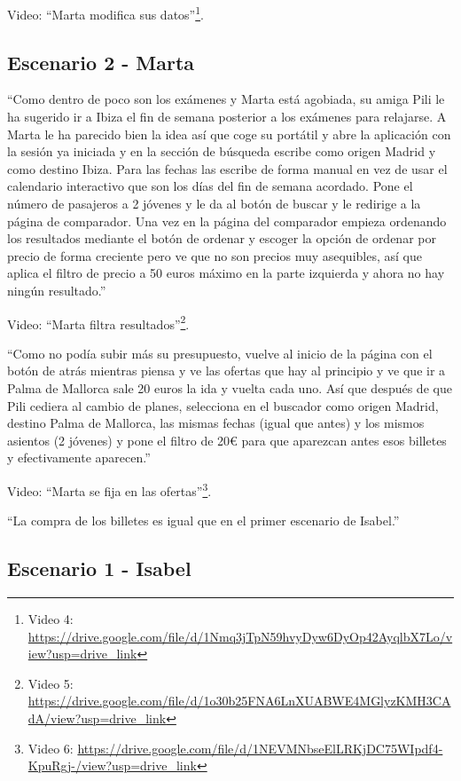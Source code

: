 Video: ``Marta modifica sus datos''\footnote{Video 4: \url{https://drive.google.com/file/d/1Nmq3jTpN59hvyDyw6DyOp42AyqlbX7Lo/view?usp=drive_link}}.


\subsection{Escenario 2 - Marta}

``Como dentro de poco son los exámenes y Marta está agobiada, su amiga Pili le ha sugerido ir a Ibiza el fin de semana posterior a los exámenes para relajarse. A Marta le ha parecido bien la idea así que coge su portátil y abre la aplicación con la sesión ya iniciada y en la sección de búsqueda escribe como origen Madrid y como destino Ibiza. Para las fechas las escribe de forma manual en vez de usar el calendario interactivo que son los días del fin de semana acordado. Pone el número de pasajeros a 2 jóvenes y le da al botón de buscar y le redirige a la página de comparador.
Una vez en la página del comparador empieza ordenando los resultados mediante el botón de ordenar y escoger la opción de ordenar por precio de forma creciente pero ve que no son precios muy asequibles, así que aplica el filtro de precio a 50 euros máximo en la parte izquierda y ahora no hay ningún resultado.''

Video: ``Marta filtra resultados''\footnote{Video 5: \url{https://drive.google.com/file/d/1o30b25FNA6LnXUABWE4MGlyzKMH3CAdA/view?usp=drive_link}}.

``Como no podía subir más su presupuesto, vuelve al inicio de la página con el botón de atrás mientras piensa y ve las ofertas que hay al principio y ve que ir a Palma de Mallorca sale 20 euros la ida y vuelta cada uno. Así que después de que Pili cediera al cambio de planes, selecciona en el buscador como origen Madrid, destino Palma de Mallorca, las mismas fechas (igual que antes) y los mismos asientos (2 jóvenes) y pone el filtro de 20€ para que aparezcan antes esos billetes y efectivamente aparecen.''

Video: ``Marta se fija en las ofertas''\footnote{Video 6: \url{https://drive.google.com/file/d/1NEVMNbseElLRKjDC75WIpdf4-KpuRgj-/view?usp=drive_link}}.

``La compra de los billetes es igual que en el primer escenario de Isabel.''


\subsection{Escenario 1 - Isabel}

